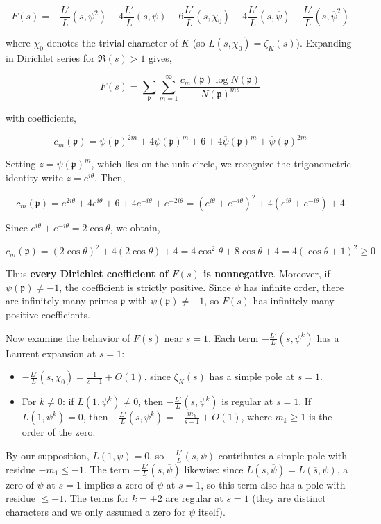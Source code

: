 \documentclass[12pt,a4paper]{article}
\begin{document}
\[
F(s) = -\frac{L'}{L}(s, \psi^2) - 4\frac{L'}{L}(s, \psi) - 6\frac{L'}{L}(s, \chi_0) - 4\frac{L'}{L}(s, \overline{\psi}) - \frac{L'}{L}(s, \overline{\psi}^2)
\]

where $\chi_0$ denotes the trivial character of $K$ (so $L(s, \chi_0) = \zeta_K(s)$). Expanding in Dirichlet series for $\Re(s) > 1$ gives,

\[
F(s) = \sum_{\mathfrak{p}} \sum_{m=1}^{\infty} \frac{c_m(\mathfrak{p}) \log N(\mathfrak{p})}{N(\mathfrak{p})^{ms}}
\]

with coefficients,

\[
c_m(\mathfrak{p}) = \psi(\mathfrak{p})^{2m} + 4\psi(\mathfrak{p})^m + 6 + 4\overline{\psi}(\mathfrak{p})^m + \overline{\psi}(\mathfrak{p})^{2m}
\]

Setting $z = \psi(\mathfrak{p})^m$, which lies on the unit circle, we recognize the trigonometric identity write $z = e^{i\theta}$. Then,

\[
c_m(\mathfrak{p}) = e^{2i\theta} + 4e^{i\theta} + 6 + 4e^{-i\theta} + e^{-2i\theta} = (e^{i\theta} + e^{-i\theta})^2 + 4(e^{i\theta} + e^{-i\theta}) + 4
\]

Since $e^{i\theta} + e^{-i\theta} = 2\cos\theta$, we obtain,

\[
c_m(\mathfrak{p}) = (2\cos\theta)^2 + 4(2\cos\theta) + 4 = 4\cos^2\theta + 8\cos\theta + 4 = 4(\cos\theta + 1)^2 \geq 0
\]

Thus \textbf{every Dirichlet coefficient of $F(s)$ is nonnegative}. Moreover, if $\psi(\mathfrak{p}) \neq -1$, the coefficient is strictly positive. Since $\psi$ has infinite order, there are infinitely many primes $\mathfrak{p}$ with $\psi(\mathfrak{p}) \neq -1$, so $F(s)$ has infinitely many positive coefficients.

Now examine the behavior of $F(s)$ near $s=1$. Each term $-\frac{L'}{L}(s, \psi^k)$ has a Laurent expansion at $s=1$:

\begin{itemize}
    \item $-\frac{L'}{L}(s, \chi_0) = \frac{1}{s-1} + O(1)$, since $\zeta_K(s)$ has a simple pole at $s=1$.
    \item For $k \neq 0$: if $L(1, \psi^k) \neq 0$, then $-\frac{L'}{L}(s, \psi^k)$ is regular at $s=1$. If $L(1, \psi^k) = 0$, then $-\frac{L'}{L}(s, \psi^k) = -\frac{m_k}{s-1} + O(1)$, where $m_k \geq 1$ is the order of the zero.
\end{itemize}

By our supposition, $L(1, \psi) = 0$, so $-\frac{L'}{L}(s, \psi)$ contributes a simple pole with residue $-m_1 \leq -1$. The term $-\frac{L'}{L}(s, \overline{\psi})$ likewise: since $L(s, \overline{\psi}) = \overline{L(\overline{s}, \psi)}$, a zero of $\psi$ at $s=1$ implies a zero of $\overline{\psi}$ at $s=1$, so this term also has a pole with residue $\leq -1$. The terms for $k = \pm 2$ are regular at $s=1$ (they are distinct characters and we only assumed a zero for $\psi$ itself).
\end{document}
